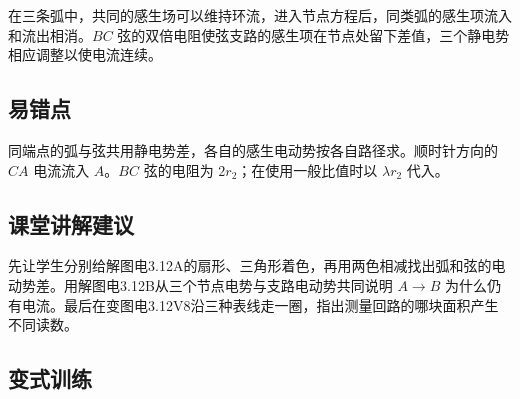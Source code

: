 \documentclass[UTF8,fontset=fandol,a4paper,11pt]{ctexart}
\begin{document}
在三条弧中，共同的感生场可以维持环流，进入节点方程后，同类弧的感生项流入和流出相消。$BC$ 弦的双倍电阻使弦支路的感生项在节点处留下差值，三个静电势相应调整以使电流连续。



\subsection*{易错点}

同端点的弧与弦共用静电势差，各自的感生电动势按各自路径求。顺时针方向的 $CA$ 电流流入 $A$。$BC$ 弦的电阻为 $2r_2$；在使用一般比值时以 $\lambda r_2$ 代入。



\subsection*{课堂讲解建议}

先让学生分别给解图电3.12A的扇形、三角形着色，再用两色相减找出弧和弦的电动势差。用解图电3.12B从三个节点电势与支路电动势共同说明 $A\to B$ 为什么仍有电流。最后在变图电3.12V8沿三种表线走一圈，指出测量回路的哪块面积产生不同读数。


\subsection*{变式训练}
\end{document}
